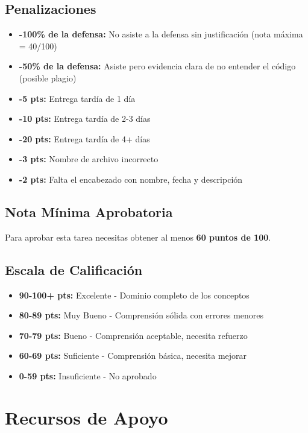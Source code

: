 \documentclass[12pt,a4paper]{article}
\begin{document}
\subsection{Penalizaciones}

\begin{itemize}[leftmargin=*]
    \item \textbf{-100\% de la defensa:} No asiste a la defensa sin justificación (nota máxima = 40/100)
    \item \textbf{-50\% de la defensa:} Asiste pero evidencia clara de no entender el código (posible plagio)
    \item \textbf{-5 pts:} Entrega tardía de 1 día
    \item \textbf{-10 pts:} Entrega tardía de 2-3 días
    \item \textbf{-20 pts:} Entrega tardía de 4+ días
    \item \textbf{-3 pts:} Nombre de archivo incorrecto
    \item \textbf{-2 pts:} Falta el encabezado con nombre, fecha y descripción
\end{itemize}

\subsection{Nota Mínima Aprobatoria}

Para aprobar esta tarea necesitas obtener al menos \textbf{60 puntos de 100}.

\subsection{Escala de Calificación}

\begin{itemize}
    \item \textbf{90-100+ pts:} Excelente - Dominio completo de los conceptos
    \item \textbf{80-89 pts:} Muy Bueno - Comprensión sólida con errores menores
    \item \textbf{70-79 pts:} Bueno - Comprensión aceptable, necesita refuerzo
    \item \textbf{60-69 pts:} Suficiente - Comprensión básica, necesita mejorar
    \item \textbf{0-59 pts:} Insuficiente - No aprobado
\end{itemize}

\section{Recursos de Apoyo}
\end{document}
